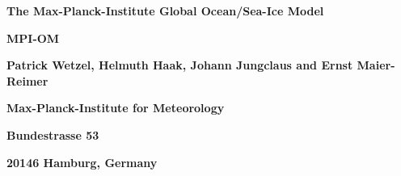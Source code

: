 
\begin{titlepage}

\vspace*{3.cm}
 
\centerline{\Large {\bf The Max-Planck-Institute Global Ocean/Sea-Ice Model}}
\centerline{\Large {\bf MPI-OM}}


\vspace*{3.cm}

 
\centerline{{\bf Patrick Wetzel, Helmuth Haak, Johann Jungclaus and Ernst Maier-Reimer }}


\vspace*{3.cm}
\centerline{{\bf Max-Planck-Institute for Meteorology }}
\centerline{{\bf Bundestrasse 53 }}
\centerline{{\bf 20146 Hamburg, Germany }}

\end{titlepage}
 

\clearpage













